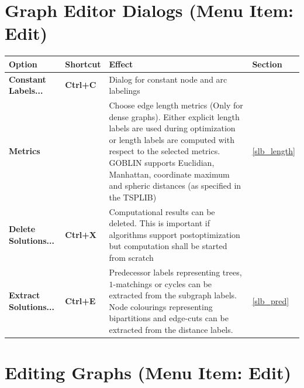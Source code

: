 \documentclass[a4paper,11pt,twoside]{book}
\begin{document}
\vfill
\bigskip
\section{Graph Editor Dialogs (Menu Item: Edit)}

\begin{tabular}{p{4cm}|p{2cm}|p{17cm}|p{1.5cm}} 
\large\bf Option &  \large\bf Shortcut & \large\bf Effect & \large\bf Section \\
[1mm] \hline \hline
\bf Constant Labels... &\bf Ctrl+C&
    Dialog for constant node and arc labelings \\ \hline
\bf Metrics &\bf & 
    Choose edge length metrics (Only for dense graphs). Either explicit length
    labels are used during optimization or length labels are computed with respect
    to the selected metrics. GOBLIN supports Euclidian, Manhattan, coordinate
    maximum and spheric distances (as specified in the TSPLIB) &
    \ref{slb_length} \\ \hline
\bf Delete Solutions... & \bf Ctrl+X &
    Computational results can be deleted. This is important if algorithms support
    postoptimization but computation shall be started from scratch \\ \hline
\bf Extract Solutions... & \bf Ctrl+E &
    Predecessor labels representing trees, $1$-matchings or cycles can be
    extracted from the subgraph labels. Node colourings representing
    bipartitions and edge-cuts can be extracted from the distance labels. &
    \ref{slb_pred}
\end{tabular}


\vfill
\bigskip
\section{Editing Graphs (Menu Item: Edit)}
\end{document}
